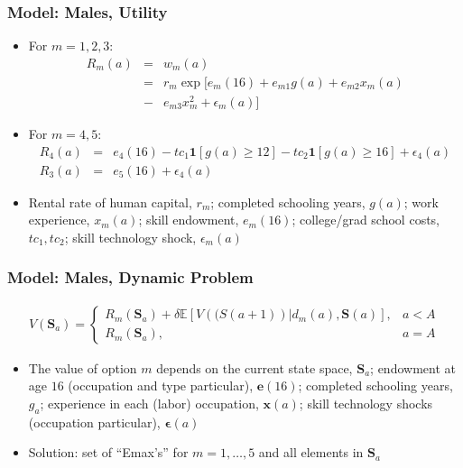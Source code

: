\begin{frame}
	\frametitle{Model: Males, Utility}
	\begin{itemize}
		\item For $m = 1, 2, 3$:
		\begin{eqnarray}
			R_{m}(a) &=& w_{m}(a) \nonumber \\
			         &=& r_{m} \exp [ e_{m}(16) + e_{m1}g(a) + e_{m2}x_{m}(a) \nonumber \\ 
			         &-& e_{m3}x_{m}^2 + \epsilon_{m}(a) ] \nonumber
		\end{eqnarray}
		\item For $m = 4, 5$:
		\begin{eqnarray}
			R_{4}(a) &=& e_{4}(16) - tc_{1} \mathbf{1} [g(a) \geq 12] - tc_{2} \mathbf{1} [g(a) \geq 16] + \epsilon_{4}(a) \nonumber \\
			R_{3}(a) &=& e_{5}(16) + \epsilon_{4}(a) \nonumber
		\end{eqnarray}
		\item Rental rate of human capital, $r_{m}$; completed schooling years, $g(a)$; work experience, $x_{m}(a)$; skill endowment, $e_{m}(16)$; college/grad school costs, $tc_{1},tc_{2}$; skill technology shock, $\epsilon_{m}(a)$
	\end{itemize}
\end{frame}

\begin{frame}
	\frametitle{Model: Males, Dynamic Problem}
	\begin{eqnarray}
	V(\mathbf{S}_{a}) =
		\begin{cases}
			R_{m} (\mathbf{S}_{a}) + \delta \mathbb{E} \left[ V (\mathbf(S(a+1)) | d_{m}(a), \mathbf{S}(a) \right], & a < A \nonumber \\
			R_{m} (\mathbf{S}_{a}) \nonumber, & a = A
		\end{cases}
	\end{eqnarray}
	\begin{itemize}
		\item The value of option $m$ depends on the current state space, $\mathbf{S}_a$; endowment at age $16$ (occupation and type particular), $\mathbf{e}(16)$; completed schooling years, $g_{a}$; experience in each (labor) occupation, $\mathbf{x}(a)$; skill technology shocks (occupation particular), $\mathbf{\epsilon}(a)$
		\item Solution: set of ``Emax's'' for $m = 1, \ldots, 5$ and all elements in $\mathbf{S}_a$
	\end{itemize}
\end{frame}

